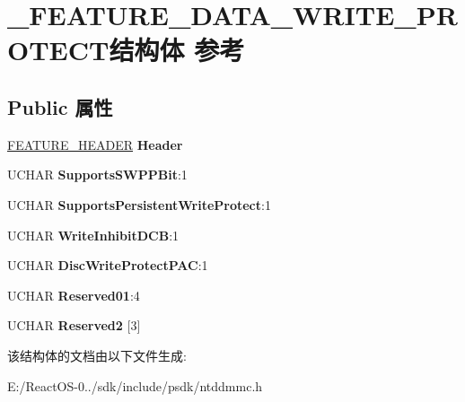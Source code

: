 \hypertarget{struct___f_e_a_t_u_r_e___d_a_t_a___w_r_i_t_e___p_r_o_t_e_c_t}{}\section{\+\_\+\+F\+E\+A\+T\+U\+R\+E\+\_\+\+D\+A\+T\+A\+\_\+\+W\+R\+I\+T\+E\+\_\+\+P\+R\+O\+T\+E\+C\+T结构体 参考}
\label{struct___f_e_a_t_u_r_e___d_a_t_a___w_r_i_t_e___p_r_o_t_e_c_t}
\subsection*{Public 属性}
\begin{DoxyCompactItemize}
\item 
\mbox{\label{struct___f_e_a_t_u_r_e___d_a_t_a___w_r_i_t_e___p_r_o_t_e_c_t_aa8f14701c9a851c444d35b1b900921a8}} 
\hyperlink{struct___f_e_a_t_u_r_e___h_e_a_d_e_r}{F\+E\+A\+T\+U\+R\+E\+\_\+\+H\+E\+A\+D\+ER} {\bfseries Header}
\item 
\mbox{\label{struct___f_e_a_t_u_r_e___d_a_t_a___w_r_i_t_e___p_r_o_t_e_c_t_a96c617e677c568a02ec37d2ad8abe73b}} 
U\+C\+H\+AR {\bfseries Supports\+S\+W\+P\+P\+Bit}\+:1
\item 
\mbox{\label{struct___f_e_a_t_u_r_e___d_a_t_a___w_r_i_t_e___p_r_o_t_e_c_t_a003e78160bb2b94c40e96691d3ff5749}} 
U\+C\+H\+AR {\bfseries Supports\+Persistent\+Write\+Protect}\+:1
\item 
\mbox{\label{struct___f_e_a_t_u_r_e___d_a_t_a___w_r_i_t_e___p_r_o_t_e_c_t_adbe99e3543fb06b4c51d32a7534d0026}} 
U\+C\+H\+AR {\bfseries Write\+Inhibit\+D\+CB}\+:1
\item 
\mbox{\label{struct___f_e_a_t_u_r_e___d_a_t_a___w_r_i_t_e___p_r_o_t_e_c_t_af700de615cb2350e8b00b3ba8908e6c3}} 
U\+C\+H\+AR {\bfseries Disc\+Write\+Protect\+P\+AC}\+:1
\item 
\mbox{\label{struct___f_e_a_t_u_r_e___d_a_t_a___w_r_i_t_e___p_r_o_t_e_c_t_ac151cd2eb99d8418a2d128759b3c0d70}} 
U\+C\+H\+AR {\bfseries Reserved01}\+:4
\item 
\mbox{\label{struct___f_e_a_t_u_r_e___d_a_t_a___w_r_i_t_e___p_r_o_t_e_c_t_a515ae277f4a13a1111b8c645093b8389}} 
U\+C\+H\+AR {\bfseries Reserved2} \mbox{[}3\mbox{]}
\end{DoxyCompactItemize}


该结构体的文档由以下文件生成\+:\begin{DoxyCompactItemize}
\item 
E\+:/\+React\+O\+S-\/0../sdk/include/psdk/ntddmmc.\+h\end{DoxyCompactItemize}
